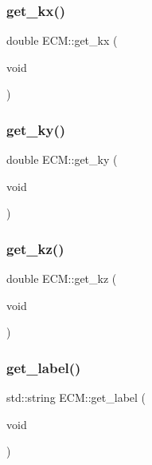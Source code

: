 \subsubsection{\texorpdfstring{get\_kx()}{get\_kx()}}
{\footnotesize\ttfamily double E\+C\+M\+::get\+\_\+kx (\begin{DoxyParamCaption}\item[{void}]{ }\end{DoxyParamCaption})\hspace{0.3cm}{\ttfamily [inline]}}

\mbox{\label{classECM_ae33002f6f6203246cce7ad05c160e051}} 
\subsubsection{\texorpdfstring{get\_ky()}{get\_ky()}}
{\footnotesize\ttfamily double E\+C\+M\+::get\+\_\+ky (\begin{DoxyParamCaption}\item[{void}]{ }\end{DoxyParamCaption})\hspace{0.3cm}{\ttfamily [inline]}}

\mbox{\label{classECM_ad1cc47474c4e005570073d3be0504724}} 
\subsubsection{\texorpdfstring{get\_kz()}{get\_kz()}}
{\footnotesize\ttfamily double E\+C\+M\+::get\+\_\+kz (\begin{DoxyParamCaption}\item[{void}]{ }\end{DoxyParamCaption})\hspace{0.3cm}{\ttfamily [inline]}}

\mbox{\label{classECM_a2979fbe785c15c43932ba9f6590fd4ef}} 
\subsubsection{\texorpdfstring{get\_label()}{get\_label()}}
{\footnotesize\ttfamily std\+::string E\+C\+M\+::get\+\_\+label (\begin{DoxyParamCaption}\item[{void}]{ }\end{DoxyParamCaption})\hspace{0.3cm}{\ttfamily [inline]}}

